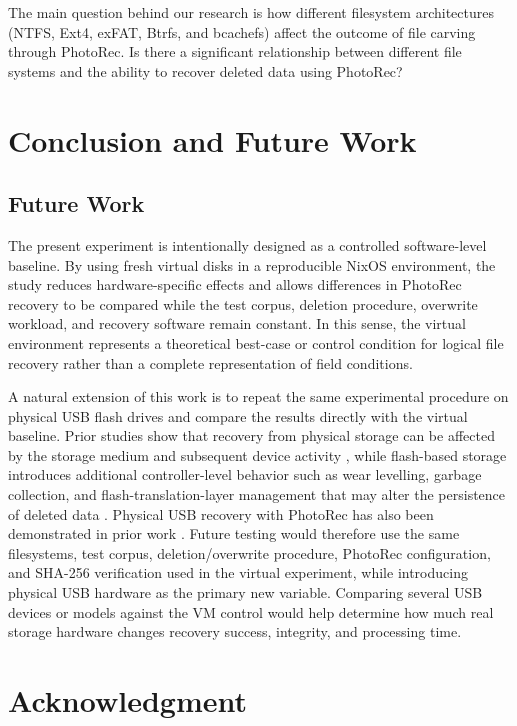 \documentclass[conference]{IEEEtran}
\begin{document}
The main question behind our research is how different filesystem architectures (NTFS, Ext4, exFAT, Btrfs, and bcachefs) affect the outcome of file carving through PhotoRec.
Is there a significant relationship between different file systems and the ability to recover deleted data using PhotoRec?

\section{Conclusion and Future Work}
\subsection{Future Work}
The present experiment is intentionally designed as a controlled software-level baseline. By using fresh virtual disks in a reproducible NixOS environment, the study reduces hardware-specific effects and allows differences in PhotoRec recovery to be compared while the test corpus, deletion procedure, overwrite workload, and recovery software remain constant. In this sense, the virtual environment represents a theoretical best-case or control condition for logical file recovery rather than a complete representation of field conditions.

A natural extension of this work is to repeat the same experimental procedure on physical USB flash drives and compare the results directly with the virtual baseline. Prior studies show that recovery from physical storage can be affected by the storage medium and subsequent device activity \cite{chhajed2024persistence}, while flash-based storage introduces additional controller-level behavior such as wear levelling, garbage collection, and flash-translation-layer management that may alter the persistence of deleted data \cite{iqbal2020ssdtrim,chen2022ransomware}. Physical USB recovery with PhotoRec has also been demonstrated in prior work \cite{pratama2021photorec}. Future testing would therefore use the same filesystems, test corpus, deletion/overwrite procedure, PhotoRec configuration, and SHA-256 verification used in the virtual experiment, while introducing physical USB hardware as the primary new variable. Comparing several USB devices or models against the VM control would help determine how much real storage hardware changes recovery success, integrity, and processing time.

\section*{Acknowledgment}


\end{document}
